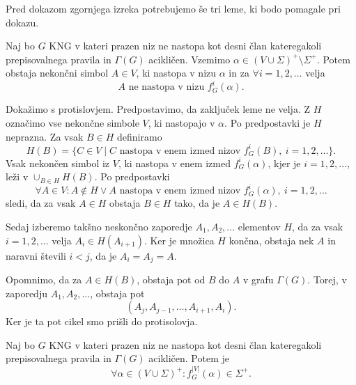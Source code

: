 \documentclass[fin1, tisk]{fmfdelo}
\providecommand{\abs}[1]{\left\lvert #1 \right\rvert}
\theoremstyle{definition}
\begin{document}
Pred dokazom zgornjega izreka potrebujemo še tri leme, ki bodo pomagale pri dokazu.

\begin{lema}\label{lema:pomožna}
    Naj bo $G$ KNG v kateri prazen niz ne nastopa kot desni član kateregakoli prepisovalnega 
    pravila in $\Gamma(G)$ acikličen. Vzemimo $\alpha \in ( V \cup \Sigma)^+ \setminus \Sigma^+$.
    Potem obstaja nekončni simbol $ A \in V $, ki nastopa v nizu $\alpha$ in za $\forall i=1,2,\ldots$
    velja
    \[
        A \text{ ne nastopa v nizu } f^i_G(\alpha).
    \]
\end{lema}

\begin{dokaz}
    Dokažimo s protislovjem. Predpostavimo, da zaključek leme ne velja. Z $H$ označimo vse 
    nekončne simbole $V$, ki nastopajo v $\alpha$. Po predpostavki je $H$ neprazna. Za vsak 
    $B \in H$ definiramo 
    \[
        H(B) = \{ C \in V \mid C \text{ nastopa v enem izmed nizov } f^i_G(B), \ i= 1, 2, \ldots \}.
    \]
    Vsak nekončen simbol iz $V$, ki nastopa v enem izmed $f^i_G(\alpha)$, kjer je $i= 1, 2, \ldots$,
    leži v $\cup_{B \in H}H(B)$. Po predpostavki
    \[
        \forall A \in V \colon A \notin H \vee A \text{ nastopa v enem izmed nizov } f^i_G(\alpha),
        \ i= 1, 2, \ldots
    \]
    sledi, da za vsak $A \in H$ obstaja $B \in H$ tako, da je $A \in H(B)$.

    Sedaj izberemo takšno neskončno zaporedje $A_1, A_2, \ldots$ elementov $H$, da za vsak
    $i= 1, 2, \ldots$ velja $A_i \in H(A_{i+1})$. Ker je množica $H$ končna, obstaja nek 
    $A$ in naravni števili $i < j$, da je $A_{i} = A_{j} = A$.

    Opomnimo, da za $A \in H(B)$, obstaja pot od $B$ do $A$ v grafu $\Gamma(G)$. 
    Torej, v zaporedju $A_1, A_2, \ldots$, obstaja pot
    \[
        (A_j, A_{j-1}, \ldots, A_{i+1}, A_i).
    \]
    Ker je ta pot cikel smo prišli do protisolovja.
\end{dokaz}

\begin{lema}\label{lema:izračun}
    Naj bo $G$ KNG v kateri prazen niz ne nastopa kot desni član 
    kateregakoli prepisovalnega pravila in $\Gamma(G)$ acikličen. Potem je
    \[
        \forall \alpha \in ( V \cup \Sigma)^+ \colon f^{\abs{V}}_G(\alpha) \in \Sigma^+.
    \]
\end{lema}
\end{document}
